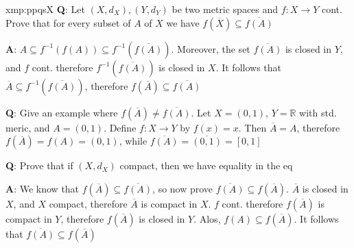 \documentclass[landscape, 8pt]{extarticle}
\begin{document}
\begin{multicols}{3}


\begin{xmp}{xmp:ppqs}{X}
    \textbf{Q}: Let $(X, d_{X}), (Y, d_{Y})$ be two metric spaces and $f : X \to Y$ cont. Prove that for every subset of $A$ of $X$ we have $f(\overline{X}) \subseteq \overline{f(A)}$

    \textbf{A}: $A \subseteq f^{-1}(f(A)) \subseteq f^{-1}(\overline{f(A)})$. Moreover, the set $\overline{f(A)}$ is closed in $Y$, and $f$ cont. therefore $f^{-1}(\overline{f(A)})$ is closed in $X$. It follows that $\overline{A} \subseteq f^{-1}(\overline{f(A)})$, therefore $f(\overline{A}) \subseteq \overline{f(A)}$

    \textbf{Q}: Give an example where $f(\overline{A}) \ne \overline{f(A)}$. Let $X = (0,1)$, $Y = \mathbb{R}$ with std. meric, and $A = (0,1)$. Define $f : X\to Y$ by $f(x) = x$. Then $\overline{A} = A$, therefore $f(\overline{A}) = f(A) = (0,1)$, while $\overline{f(A)} = \overline{(0,1)} = [0,1]$

    \textbf{Q}: Prove that if $(X, d_{X})$ compact, then we have equality in the eq

    \textbf{A}: We know that $f(\overline{A}) \subseteq \overline{f(A)}$, so now prove $\overline{f(A)} \subseteq f(\overline{A})$. $\overline{A}$ is closed in $X$, and $X$ compact, therefore $\overline{A}$ is compact in $X$. $f$ cont. therefore $f(\overline{A})$ is compact in $Y$, therefore $f(\overline{A})$ is closed in $Y$. Alos, $f(A) \subseteq f(\overline{A})$. It follows that $\overline{f(A)} \subseteq f(\overline{A})$


\end{xmp}
\end{multicols}
\end{document}
